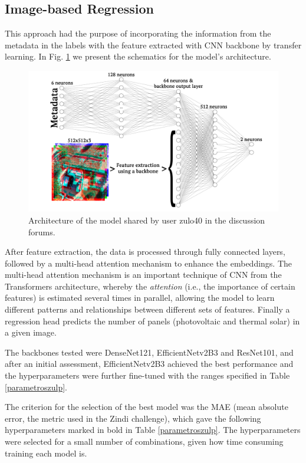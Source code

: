 \documentclass[conference]{IEEEtran}
\begin{document}
\subsection{Image-based Regression}

This approach had the purpose of incorporating the information from the metadata in the labels with the feature extracted with CNN backbone by transfer learning. In Fig. \ref{fig:nn} we present the schematics for the model's architecture.

\begin{figure}[H]
    \centering
    \includegraphics[width=1\linewidth]{assets/nn.png}
    \caption{Architecture of the model shared by user zulo40 in the discussion forums. \cite{zulo4thewin}}
    \label{fig:nn}
\end{figure}

After feature extraction, the data is processed through fully connected layers, followed by a multi-head attention mechanism to enhance the embeddings. The multi-head attention mechanism is an important technique of CNN from the Transformers architecture, whereby the \textit{attention} (i.e., the importance of certain features) is estimated several times in parallel, allowing the model to learn different patterns and relationships between different sets of features. Finally a regression head predicts the number of panels (photovoltaic and thermal solar) in a given image.

The backbones tested were DenseNet121, EfficientNetv2B3 and ResNet101, and after an initial assessment, EfficientNetv2B3 achieved the best performance and the hyperparameters were further fine-tuned with the ranges specified in Table \ref{parametroszulp}.

The criterion for the selection of the best model was the MAE (mean absolute error, the metric used in the Zindi challenge), which gave the following hyperparameters marked in bold in Table \ref{parametroszulp}. The hyperparameters were selected for a small number of combinations, given how time consuming training each model is.
\end{document}
